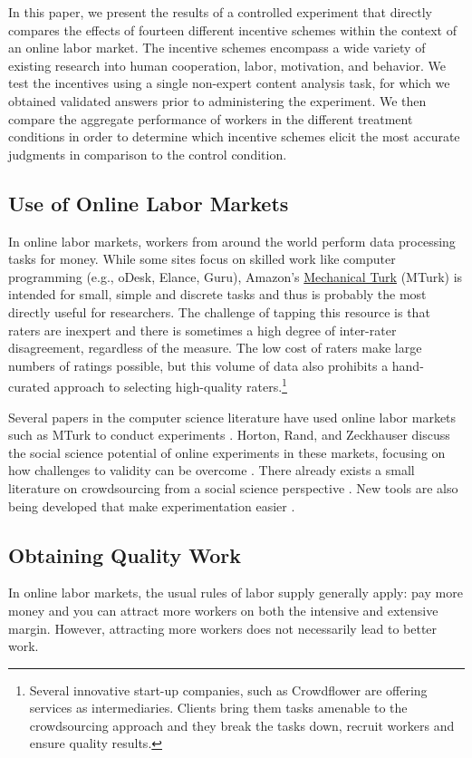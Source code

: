 \documentclass{chi2009}
\begin{document}
In this paper, we present the results of a controlled experiment that directly compares the effects of fourteen different incentive schemes within the context of an online labor market. The incentive schemes encompass a wide variety of existing research into human cooperation, labor, motivation, and behavior. We test the incentives using a single non-expert content analysis task, for which we obtained validated answers prior to administering the experiment. We then compare the aggregate performance of workers in the different treatment conditions in order to determine which incentive schemes elicit the most accurate judgments in comparison to the control condition. 

\subsection{Use of Online Labor Markets}
In online labor markets, workers from around the world perform data
processing tasks for money. While some sites focus on skilled work
like computer programming (e.g., oDesk, Elance, Guru), Amazon's
\href{https://www.mturk.com/mturk/welcome}{Mechanical Turk} (MTurk) is
intended for small, simple and discrete tasks and thus is probably the
most directly useful for researchers. The challenge of tapping this
resource is that raters are inexpert and there is sometimes a high
degree of inter-rater disagreement, regardless of the measure.  The
low cost of raters make large numbers of ratings possible, but this
volume of data also prohibits a hand-curated approach to selecting
high-quality raters.\footnote{Several innovative start-up companies,
  such as Crowdflower are offering services as intermediaries. Clients
  bring them tasks amenable to the crowdsourcing approach and they
  break the tasks down, recruit workers and ensure quality results.}

Several papers in the computer science literature have used online
labor markets such as MTurk to conduct experiments
\cite{kittur2008crowdsourcing, snow2008cheap, sheng2008get}. Horton,
Rand, and Zeckhauser discuss the social science potential of online
experiments in these markets, focusing on how challenges to validity
can be overcome \cite{hortonZeck2010}. There already exists a small
literature on crowdsourcing from a social science perspective
\cite{huberman-crowdsourcing, mason2009fip, horton2010labor,
  chen2009}. New tools are also being developed that make
experimentation easier \cite{little-turkit}.

\subsection{Obtaining Quality Work} 
In online labor markets, the usual rules of labor supply generally
apply: pay more money and you can attract more workers on both the
intensive and extensive margin. However, attracting more workers does
not necessarily lead to better work. 
\end{document}
